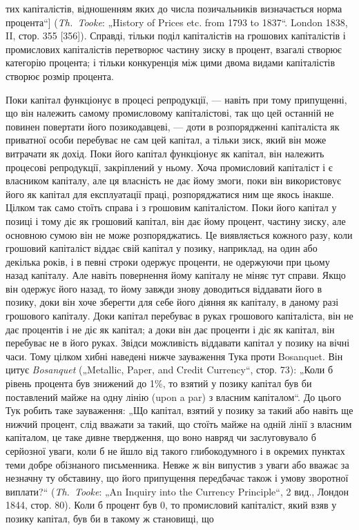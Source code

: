 \parcont{}  %
тих капіталістів, відношенням яких до числа позичальників визначається
норма процента“] (\emph{Th.~Tooke}: „History of Prices etc.
from 1793 to 1837“. London 1838, II, стор. 355 [356]). Справді, тільки
поділ капіталістів на грошових капіталістів і промислових капіталістів
перетворює частину зиску в процент, взагалі створює
категорію процента; і тільки конкуренція між цими двома видами
капіталістів створює розмір процента.

Поки капітал функціонує в процесі репродукції, — навіть при
тому припущенні, що він належить самому промисловому капіталістові,
так що цей останній не повинен повертати його позикодавцеві,
— доти в розпорядженні капіталіста як приватної
особи перебуває не сам цей капітал, а тільки зиск, який він
може витрачати як дохід. Поки його капітал функціонує як
капітал, він належить процесові репродукції, закріплений у ньому.
Хоча промисловий капіталіст і є власником капіталу, але ця власність
не дає йому змоги, поки він використовує його як капітал
для експлуатації праці, розпоряджатися ним ще якось інакше.
Цілком так само стоїть справа і з грошовим капіталістом. Поки
його капітал у позиці і тому діє як грошовий капітал, він
дає йому процент, частину зиску, але основною сумою він не
може розпоряджатись. Це виявляється кожного разу, коли грошовий
капіталіст віддає свій капітал у позику, наприклад, на
один або декілька років, і в певні строки одержує проценти,
не одержуючи при цьому назад капіталу. Але навіть повернення
йому капіталу не міняє тут справи. Якщо він одержує
його назад, то йому завжди знову доводиться віддавати його
в позику, доки він хоче зберегти для себе його діяння як
капіталу, в даному разі грошового капіталу. Доки капітал
перебуває в руках грошового капіталіста, він не дає процентів
і не діє як капітал; а доки він дає проценти і діє як капітал,
він перебуває не в його руках. Звідси можливість
віддавати капітал у позику на вічні часи. Тому цілком хибні
наведені нижче зауваження Тука проти Bosanquet. Він цитує
\emph{Bosanquet} („Metallic, Paper, and Credit Currency“, стор. 73):
„Коли б рівень процента був знижений до 1\%, то взятий
у позику капітал був би поставлений майже на одну лінію (upon
a par) з власним капіталом“. До цього Тук робить таке зауваження:
„Що капітал, взятий у позику за такий або навіть ще
нижчий процент, слід вважати за такий, що стоїть майже на
одній лінії з власним капіталом, це таке дивне твердження, що
воно навряд чи заслуговувало б серйозної уваги, коли б не
йшло від такого глибокодумного і в окремих пунктах теми
добре обізнаного письменника. Невже ж він випустив з уваги
або вважає за незначну ту обставину, що його припущення
передбачає також і умову зворотної виплати?“ (\emph{Th.~Tooke}: „An
Inquiry into the Currency Principle“, 2 вид., Лондон 1844,
стор. 80). Коли б процент був \deq{} 0, то промисловий капіталіст,
який взяв у позику капітал, був би в такому ж становищі, що
\parbreak{}  %
